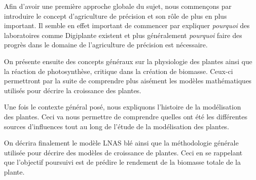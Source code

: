 Afin d'avoir une première approche globale du sujet, 
nous commençons par introduire
le concept d'agriculture de précision et son rôle de plus en plus important.
Il semble en effet important de commencer par expliquer \emph{pourquoi}
des laboratoires comme Digiplante existent et plus généralement \emph{pourquoi}
faire des progrès dans le domaine de l'agriculture de précision est nécessaire.

On présente ensuite des concepts généraux sur la physiologie des plantes
ainsi que la réaction de photosynthèse, critique dans la création
de biomasse.
Ceux-ci permettront par la suite de comprendre plus aisément
les modèles mathématiques utilisés pour décrire la croissance des plantes.

Une fois le contexte général posé, nous expliquons l'histoire de la modélisation 
des plantes. Ceci va nous permettre de comprendre quelles ont été les différentes 
sources d'influences tout au long de l'étude de la modélisation des plantes.

On décrira finalement le modèle LNAS blé ainsi que la méthodologie
générale utilisée pour décrire des modèles de croissance de plantes.
Ceci en se rappelant que l'objectif poursuivi est de prédire le rendement
de la biomasse totale de la plante.

